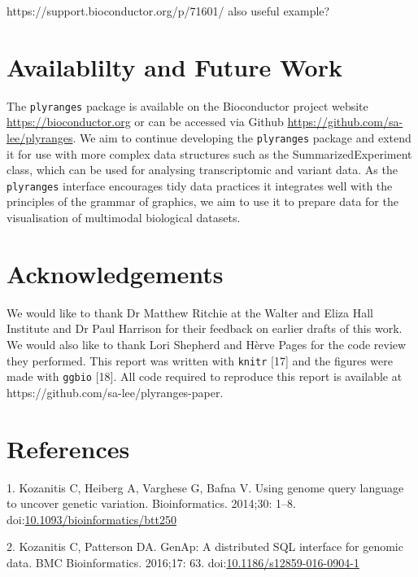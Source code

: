 \documentclass[10pt,letterpaper]{article}
\begin{document}
https://support.bioconductor.org/p/71601/ also useful example?

\section{Availablilty and Future
Work}\label{availablilty-and-future-work}

The \texttt{plyranges} package is available on the Bioconductor project
website \url{https://bioconductor.org} or can be accessed via Github
\url{https://github.com/sa-lee/plyranges}. We aim to continue developing
the \texttt{plyranges} package and extend it for use with more complex
data structures such as the SummarizedExperiment class, which can be
used for analysing transcriptomic and variant data. As the
\texttt{plyranges} interface encourages tidy data practices it
integrates well with the principles of the grammar of graphics, we aim
to use it to prepare data for the visualisation of multimodal biological
datasets.

\section{Acknowledgements}\label{acknowledgements}

We would like to thank Dr Matthew Ritchie at the Walter and Eliza Hall
Institute and Dr Paul Harrison for their feedback on earlier drafts of
this work. We would also like to thank Lori Shepherd and Hèrve Pages for
the code review they performed. This report was written with
\texttt{knitr} {[}17{]} and the figures were made with \texttt{ggbio}
{[}18{]}. All code required to reproduce this report is available at
https://github.com/sa-lee/plyranges-paper.

\section*{References}\label{references}

\hypertarget{refs}{}
\hypertarget{ref-Kozanitis2014-va}{}
1. Kozanitis C, Heiberg A, Varghese G, Bafna V. Using genome query
language to uncover genetic variation. Bioinformatics. 2014;30: 1--8.
doi:\href{https://doi.org/10.1093/bioinformatics/btt250}{10.1093/bioinformatics/btt250}

\hypertarget{ref-Kozanitis2016-bm}{}
2. Kozanitis C, Patterson DA. GenAp: A distributed SQL interface for
genomic data. BMC Bioinformatics. 2016;17: 63.
doi:\href{https://doi.org/10.1186/s12859-016-0904-1}{10.1186/s12859-016-0904-1}
\end{document}
